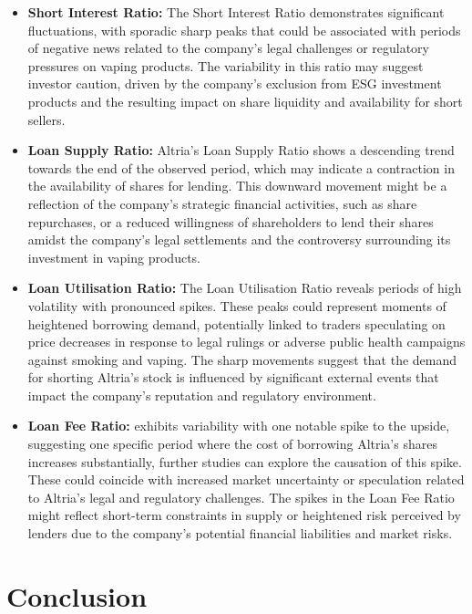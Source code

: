 \begin{itemize}
	\item\textbf{Short Interest Ratio:} The Short Interest Ratio demonstrates significant fluctuations, with sporadic sharp peaks that could be associated with periods of negative news related to the company’s legal challenges or regulatory pressures on vaping products. The variability in this ratio may suggest investor caution, driven by the company's exclusion from ESG investment products and the resulting impact on share liquidity and availability for short sellers.
	\item\textbf{Loan Supply Ratio:} Altria's Loan Supply Ratio shows a descending trend towards the end of the observed period, which may indicate a contraction in the availability of shares for lending. This downward movement might be a reflection of the company's strategic financial activities, such as share repurchases, or a reduced willingness of shareholders to lend their shares amidst the company's legal settlements and the controversy surrounding its investment in vaping products.
	\item\textbf{Loan Utilisation Ratio:} The Loan Utilisation Ratio reveals periods of high volatility with pronounced spikes. These peaks could represent moments of heightened borrowing demand, potentially linked to traders speculating on price decreases in response to legal rulings or adverse public health campaigns against smoking and vaping. The sharp movements suggest that the demand for shorting Altria's stock is influenced by significant external events that impact the company's reputation and regulatory environment.
	\item\textbf{Loan Fee Ratio:} exhibits variability with one notable spike to the upside, suggesting one specific period where the cost of borrowing Altria's shares increases substantially, further studies can explore the causation of this spike. These could coincide with increased market uncertainty or speculation related to Altria’s legal and regulatory challenges. The spikes in the Loan Fee Ratio might reflect short-term constraints in supply or heightened risk perceived by lenders due to the company's potential financial liabilities and market risks.
\end{itemize}



\doublespacing
\section{Conclusion}


